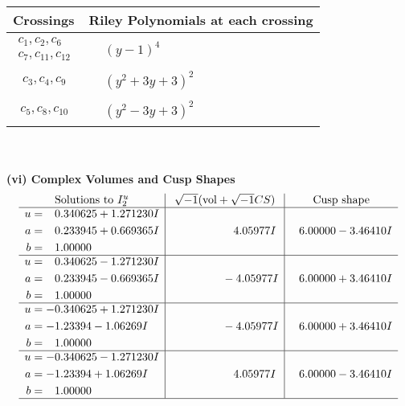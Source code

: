 \documentclass[1p]{elsarticle_modified}
\theoremstyle{definition}
\newcommand{\I}{\sqrt{-1}}
\begin{document}
\begin{tabular}{m{50pt}|m{274pt}}
Crossings & \hspace{64pt}Riley Polynomials at each crossing \\
\hline $$\begin{aligned}c_{1},c_{2},c_{6}\\c_{7},c_{11},c_{12}\end{aligned}$$&$\begin{aligned}
&(y-1)^4
\end{aligned}$\\
\hline $$\begin{aligned}c_{3},c_{4},c_{9}\end{aligned}$$&$\begin{aligned}
&(y^2+3 y+3)^2
\end{aligned}$\\
\hline $$\begin{aligned}c_{5},c_{8},c_{10}\end{aligned}$$&$\begin{aligned}
&(y^2-3 y+3)^2
\end{aligned}$\\
\hline
\end{tabular}\\~\\
\newpage\flushleft \textbf{(vi) Complex Volumes and Cusp Shapes}
$$\begin{array}{c|c|c}  
\text{Solutions to }I^u_{2}& \I (\text{vol} + \sqrt{-1}CS) & \text{Cusp shape}\\
 \hline 
\begin{aligned}
u &= \phantom{-}0.340625 + 1.271230 I \\
a &= \phantom{-}0.233945 + 0.669365 I \\
b &= \phantom{-}1.00000\phantom{ +0.000000I}\end{aligned}
 & \phantom{-0.000000 -}4.05977 I & \phantom{-}6.00000 - 3.46410 I \\ \hline\begin{aligned}
u &= \phantom{-}0.340625 - 1.271230 I \\
a &= \phantom{-}0.233945 - 0.669365 I \\
b &= \phantom{-}1.00000\phantom{ +0.000000I}\end{aligned}
 & \phantom{-0.000000 } -4.05977 I & \phantom{-}6.00000 + 3.46410 I \\ \hline\begin{aligned}
u &= -0.340625 + 1.271230 I \\
a &= -1.23394 - 1.06269 I \\
b &= \phantom{-}1.00000\phantom{ +0.000000I}\end{aligned}
 & \phantom{-0.000000 } -4.05977 I & \phantom{-}6.00000 + 3.46410 I \\ \hline\begin{aligned}
u &= -0.340625 - 1.271230 I \\
a &= -1.23394 + 1.06269 I \\
b &= \phantom{-}1.00000\phantom{ +0.000000I}\end{aligned}
 & \phantom{-0.000000 -}4.05977 I & \phantom{-}6.00000 - 3.46410 I\\
 \hline 
 \end{array}$$\newpage\newpage\renewcommand{\arraystretch}{1}
\end{document}
